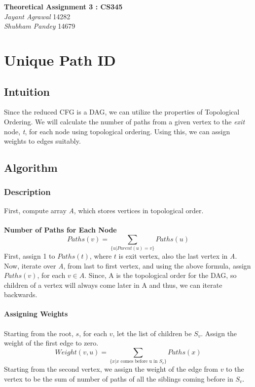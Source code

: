 \documentclass{article}
\begin{document}

\begin{center}
\textbf{\Large Theoretical Assignment 3 : CS345} \\
\textit{\large Jayant Agrawal}         14282 \\
\textit{\large Shubham Pandey}         14679
\end{center}

\section{Unique Path ID}
\subsection{Intuition}
Since the reduced CFG is a DAG, we can utilize the properties of Topological Ordering. We will calculate the number of paths from a given vertex to the \textit{exit} node, \emph{t}, for each node using topological ordering. Using this, we can assign weights to edges suitably.

\subsection{Algorithm}
\subsubsection{Description}
First, compute array \emph{A}, which stores vertices in topological order.\\ \\
\textbf{Number of Paths for Each Node}\\
$$Paths(v) = \sum_{\{u | Parent(u)=v\}}Paths(u)$$
First, assign 1 to $Paths(t)$, where $t$ is exit vertex, also the last vertex in \emph{A}. Now, iterate over \emph{A}, from last to first vertex, and using the above formula, assign $Paths(v)$, for each $v \in A$. Since, A is the topological order for the DAG, so children of a vertex will always come later in A and thus, we can iterate backwards.\\ \\
\textbf{Assigning Weights}\\ \\
Starting from the root, $s$, for each $v$, let the list of children be $S_v$. Assign the weight of the first edge to zero.
$$Weight(v,u) = \sum_{\{x|x \text{ comes before u in } S_v\}}Paths(x)$$
Starting from the second vertex, we assign the weight of the edge from $v$ to the vertex to be the sum of number of paths of all the siblings coming before in $S_v$.
\end{document}
